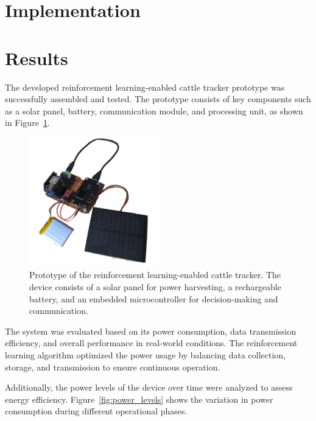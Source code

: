 \documentclass[10pt]{cai}
\begin{document}
\section{Implementation}

\section{Results}

The developed reinforcement learning-enabled cattle tracker prototype was successfully assembled and tested. The prototype consists of key components such as a solar panel, battery, communication module, and processing unit, as shown in Figure~\ref{fig:prototype}.

\begin{figure}[htbp]
  \centering
  \includegraphics[width=0.5\textwidth]{./figs/prototype_clean.png}
  \caption{Prototype of the reinforcement learning-enabled cattle tracker. The device consists of a solar panel for power harvesting, a rechargeable battery, and an embedded microcontroller for decision-making and communication.}
  \label{fig:prototype}
\end{figure}

The system was evaluated based on its power consumption, data transmission efficiency, and overall performance in real-world conditions. The reinforcement learning algorithm optimized the power usage by balancing data collection, storage, and transmission to ensure continuous operation.

Additionally, the power levels of the device over time were analyzed to assess energy efficiency. Figure~\ref{fig:power_levels} shows the variation in power consumption during different operational phases.
\end{document}
